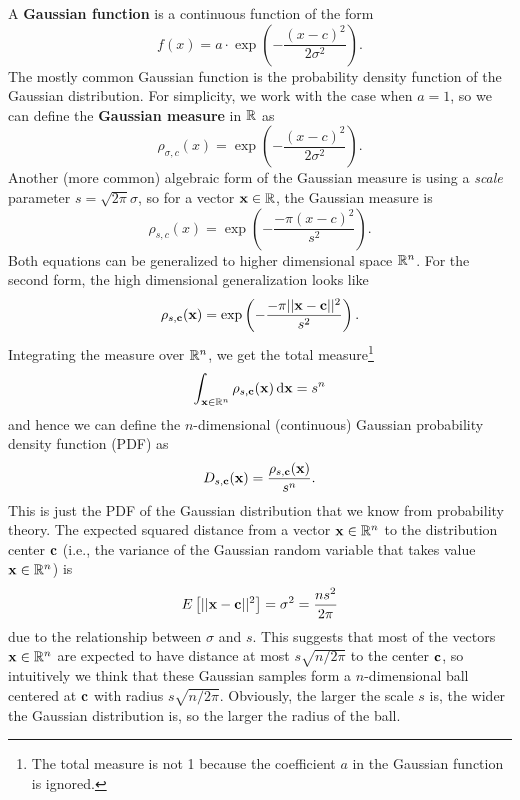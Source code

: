 \documentclass[../main.tex]{subfiles}
\begin{document}
A \textbf{Gaussian function} is a continuous function of the form 
\begin{equation*}
    f(x) = a \cdot \exp \left(-\frac{(x-c)^2}{2\sigma^2} \right).
\end{equation*}
The mostly common  Gaussian function  is the probability density function of the Gaussian distribution. For simplicity, we work with the case when $a=1$, so we can define the \textbf{Gaussian measure} in $\mathbb{R}$ as 
\reversemarginpar
{}
\begin{equation*}
    \rho_{\sigma,c}(x) = \exp\left( -\frac{(x-c)^2}{2\sigma^2}\right). 
\end{equation*}
Another (more common) algebraic form of the Gaussian measure is using a \textit{scale} parameter $s = \sqrt{2\pi} \sigma$, so for a vector $\mathbf{x} \in \mathbb{R}$, the Gaussian measure is
\begin{equation*}
    \rho_{s,c}(x) = \exp\left( -\frac{-\pi (x-c)^2}{s^2}\right).
\end{equation*}
Both equations can be generalized to higher dimensional space $\mathbb{R}^n$. For the second form, the high dimensional generalization looks like 
\begin{equation}
\label{equ:gauMeasure}
    \rho_{s,\mathbf{c}}(\mathbf{x}) = \exp\left( -\frac{-\pi ||\mathbf{x}-\mathbf{c}||^2}{s^2}\right).
\end{equation}
Integrating the measure over $\mathbb{R}^n$, we get the total measure\footnote{The total measure is not 1 because the coefficient $a$ in the Gaussian function is ignored.} %
\begin{equation*}
    \int_{\mathbf{x} \in \mathbb{R}^n} \rho_{s,\mathbf{c}}(\mathbf{x}) \mathop{}\!\mathrm{d} \mathbf{x} = s^n
\end{equation*}
and hence we can define the $n$-dimensional (continuous) Gaussian 
\reversemarginpar
{}
probability density function (PDF) as 
\begin{equation}
\label{equ:ctsGauPDF}
    D_{s,\mathbf{c}}(\mathbf{x}) = \frac{\rho_{s,\mathbf{c}}(\mathbf{x})}{s^n}.
\end{equation}
This is just the PDF of the Gaussian distribution that we know from probability theory. 
The expected squared distance from a vector $\mathbf{x} \in \mathbb{R}^n$ to the distribution center $\mathbf{c}$ (i.e., the variance of the Gaussian random variable that takes value $\mathbf{x} \in \mathbb{R}^n$) is 
\begin{equation*}
    E\left[||\mathbf{x}-\mathbf{c}||^2\right] = \sigma^2 = \frac{n s^2}{2\pi}
\end{equation*}
due to the relationship between $\sigma$ and $s$. This suggests that most of the vectors $\mathbf{x} \in \mathbb{R}^n$ are expected to have distance at most $s\sqrt{n/2\pi}$ to the center $\mathbf{c}$, so intuitively we think that these Gaussian samples form a $n$-dimensional ball centered at $\mathbf{c}$ with radius $s\sqrt{n/2\pi}$. Obviously, the larger the scale $s$ is, the wider the Gaussian distribution is, so the larger the radius of the ball. 
\end{document}
